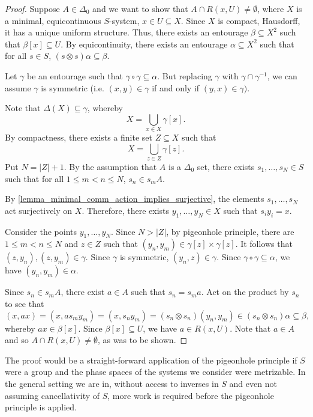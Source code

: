 \begin{proof}
    Suppose $A \in \Delta_0$ and we want to show that $A \cap R(x,U) \neq \emptyset$, where $X$ is a minimal, equicontinuous $S$-system, $x \in U \subseteq X$.  Since $X$ is compact, Hausdorff, it has a unique uniform structure.  Thus, there exists an entourage $\beta \subseteq X^2$ such that $\beta[x] \subseteq U$.  By equicontinuity, there exists an entourage $\alpha \subseteq X^2$ such that for all $s \in S$, $(s \otimes s) \alpha \subseteq \beta$.

    Let $\gamma$ be an entourage such that $\gamma \circ \gamma \subseteq \alpha$. But replacing $\gamma$ with $\gamma \cap \gamma^{-1}$, we can assume $\gamma$ is symmetric (i.e. $(x, y) \in \gamma$ if and only if $(y, x) \in \gamma)$.
    
    Note that $\Delta(X) \subseteq \gamma$, whereby
    \[
        X = \bigcup_{x \in X} \gamma[x].
    \]
    By compactness, there exists a finite set $Z \subseteq X$ such that
    \[
        X = \bigcup_{z \in Z} \gamma[z].
    \]
    Put $N = |Z|+1$.  By the assumption that $A$ is a $\Delta_0$ set, there exists $s_1, \ldots, s_N \in S$ such that for all $1 \leq m < n \leq N$, $s_n \in s_m A$.
    
    By \cref{lemma_minimal_comm_action_implies_surjective}, the elements $s_1, \ldots, s_N$ act surjectively on $X$.  Therefore, there exists $y_1, \ldots, y_N \in X$ such that $s_i y_i = x$.
    
    Consider the points $y_1, \ldots, y_N$.  Since $N > |Z|$, by pigeonhole principle, there are $1 \leq m < n \leq N$ and $z \in Z$ such that $(y_n, y_m) \in \gamma[z] \times \gamma[z]$. It follows that $(z, y_n), (z, y_m) \in \gamma$. Since $\gamma$ is symmetric, $(y_n, z) \in \gamma$. Since $\gamma \circ \gamma \subseteq \alpha$, we have $(y_n, y_m) \in \alpha$.
    
    Since $s_n \in s_m A$, there exist $a \in A$ such that $s_n = s_m a$.
    Act on the product by $s_n$ to see that
    \[
        (x,a x) = (x, a s_m y_m) = (x, s_n y_m) = (s_n \otimes s_n) (y_n, y_m) \in (s_n \otimes s_n) \alpha \subseteq \beta,
    \]
    whereby $a x \in \beta[x]$. Since $\beta[x] \subseteq U$, we have $a \in R(x,U)$.  Note that $a \in A$ and so $A \cap R(x,U) \neq \emptyset$, as was to be shown.
\end{proof}

\begin{remark}
The proof would be a straight-forward application of the pigeonhole principle if $S$ were a group and the phase spaces of the systems we consider were metrizable. In the general setting we are in, without access to inverses in $S$ and even not assuming cancellativity of $S$, more work is required before the pigeonhole principle is applied.
\end{remark}

